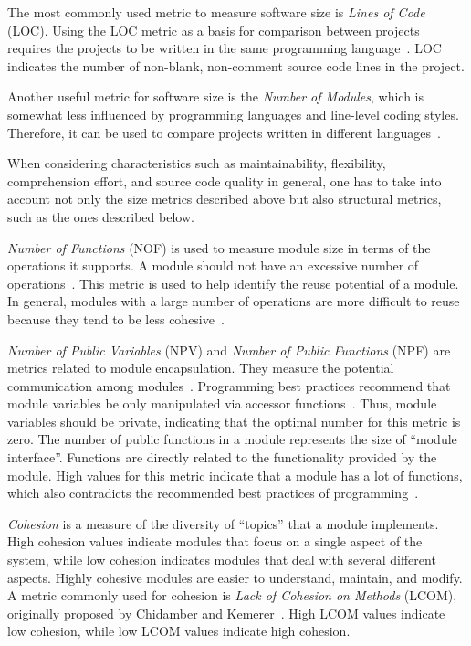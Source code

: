 \documentclass[conference]{IEEEtran}
\begin{document}
The most commonly used metric to measure software size is \emph{Lines of Code} (LOC).
%
Using the LOC metric as a basis for comparison between projects requires
the projects to be written in the same programming language~\cite{Jones91}.
LOC indicates the number of non-blank, non-comment source code lines in
the project.

Another useful metric for software size is the \emph{Number of Modules},
which is somewhat less influenced by programming languages and line-level
coding styles. Therefore, it can be used to compare projects written in
different languages~\cite{Tempero}.

When considering characteristics such as maintainability, flexibility,
comprehension effort, and source code quality in general, one has to take into
account not only the size metrics described above but also structural metrics,
such as the ones described below.

\emph{Number of Functions} (NOF) is used to measure module size in terms of
the operations it supports. A module should not have an excessive number 
of operations~\cite{beck97}.
%
This metric is used to help identify the reuse potential of a module.
In general, modules with a large number of operations are more difficult
to reuse because they tend to be less cohesive~\cite{Lorenz94}.

\emph{Number of Public Variables} (NPV) and \emph{Number of Public Functions} (NPF)
are metrics related to module encapsulation. They measure the potential
communication among modules~\cite{Bansiya97}.
%
Programming best practices recommend that module variables be only
manipulated via accessor functions~\cite{beck97}. Thus, module variables 
should be private, indicating that the optimal number for this metric is zero.
%
The number of public functions in a module represents the size of ``module interface''.
Functions are directly related to the functionality provided by the module.
High values for this metric indicate that a module has a lot of functions,
which also contradicts the recommended best practices of programming~\cite{beck97}.

\emph{Cohesion} is a measure of the diversity of ``topics'' that a
module implements. High cohesion values indicate modules that focus on a
single aspect of the system, while low cohesion indicates modules that
deal with several different aspects. Highly cohesive modules are easier to
understand, maintain, and modify.
%
A metric commonly used for cohesion is \emph{Lack of Cohesion on
Methods} (LCOM), originally proposed by Chidamber and Kemerer~\cite{Chidamber94}.
High LCOM values indicate low cohesion, while low LCOM values indicate high cohesion.
\end{document}
